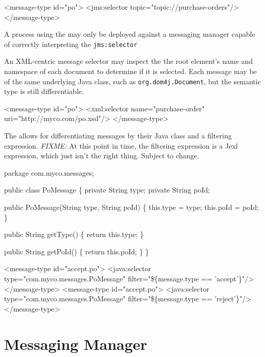 \begin{codelisting}
<message-type id="po">
    <jms:selector topic="topic://purchase-orders"/>
</message-type>
\end{codelisting}

A process using the  may only be deployed
against a messaging manager capable of correctly interpreting
the \verb|jms:selector| 

An XML-centric message selector may inspect the the root
element's name and namespace of each document to determine
if it is selected.  Each message may be of the same underlying
Java class, such as \verb|org.dom4j.Document|, but the
semantic type is still differentiable.

\begin{codelisting}
<message-type id="po">
    <xml:selector name="purchase-order" uri="http://myco.com/po.xsd"/>
</message-type>
\end{codelisting}

The  allows for differentiating messages by
their Java class and a filtering expression.  \emph{FIXME:}
At this point in time, the filtering expression is a Jexl
expression, which just isn't the right thing.  Subject to change.

\begin{codelisting}
package com.myco.messages;

public class PoMessage
\{
    private String type;
    private String poId;

    public PoMessage(String type,
                     String poId)
    \{
        this.type = type;
        this.poId = poId;
    \}

    public String getType()
    \{
        return this.type;
    \}

    public String getPoId()
    \{
        return this.poId;
    \}
\}
\end{codelisting}

\begin{codelisting}
<message-type id="accept.po">
    <java:selector type="com.myco.messages.PoMessage"
                   filter="\$\{message.type == 'accept'\}"/>
</message-type>
<message-type id="accept.po">
    <java:selector type="com.myco.messages.PoMessage"
                   filter="\$\{message.type == 'reject'\}"/>
</message-type>
\end{codelisting}

\section{Messaging Manager}


